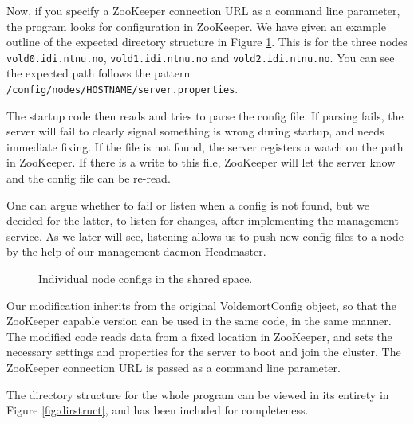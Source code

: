 Now, if you specify a ZooKeeper connection URL as a command line parameter, the program looks for configuration in ZooKeeper.
We have given an example outline of the expected directory structure in Figure \ref{fig:configdirs}. This is for the three nodes \texttt{vold0.idi.ntnu.no}, \texttt{vold1.idi.ntnu.no} and \texttt{vold2.idi.ntnu.no}. You can see the expected path follows the pattern \texttt{/config/nodes/HOSTNAME/server.properties}. 

The startup code then reads and tries to parse the config file. If parsing fails, the server will fail to clearly signal something is wrong during startup, and needs immediate fixing. If the file is not found, the server registers a watch on the path in ZooKeeper. If there is a write to this file, ZooKeeper will let the server know and the config file can be re-read. 

One can argue whether to fail or listen when a config is not found, but we decided for the latter, to listen for changes, after implementing the management service. As we later will see, listening allows us to push new config files to a node by the help of our management daemon Headmaster. 

\begin{figure}[h]
\caption{Individual node configs in the shared space.}
\label{fig:configdirs}
\end{figure}

Our modification inherits from the original VoldemortConfig object, so that the ZooKeeper capable version can be used in the same code, in the same manner. The modified code reads data from a fixed location in ZooKeeper, and sets the necessary settings and properties for the server to boot and join the cluster. The ZooKeeper connection URL is passed as a command line parameter.

The directory structure for the whole program can be viewed in its entirety in Figure \ref{fig:dirstruct}, and has been included for completeness.

